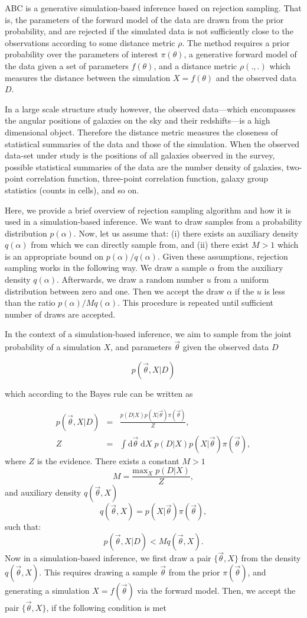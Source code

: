 \documentclass[12pt, preprint]{aastex}
\newcommand{\beq}{\begin{equation}}
\newcommand{\eeq}{\end{equation}}
\newcommand{\pars}{\vec{\theta}}
\newcommand{\dev}{\mathrm{d}}
\begin{document}
ABC is a generative simulation-based inference based on rejection sampling. That is, the parameters of the forward model of the data are drawn from the prior probability, and are rejected if the simulated data is not sufficiently close to the observations according to some distance metric $\rho$. The method requires a prior probability over the parameters of interest $\pi(\theta)$, a generative forward model of the data given a set of parameters $f(\theta)$, and a distance metric $\rho(.,.)$ which measures the distance between the simulation $X=f(\theta)$ and the observed data $D$. 

In a large scale structure study however, the observed data---which encompasses the angular positions of galaxies on the sky and their redshifts---is a high dimensional object. Therefore the distance metric measures the closeness of statistical summaries of the data and those of the simulation. When the observed data-set under study is the positions of all galaxies observed in the survey, possible statistical summaries of the data are the number density of galaxies, two-point correlation function, three-point correlation function, galaxy group statistics (counts in cells), and so on.

Here, we provide a brief overview of rejection sampling algorithm and how it is used in a simulation-based inference. We want to draw samples from a probability distribution $p(\alpha)$. Now, let us assume that: (i) there exists an auxiliary density $q(\alpha)$ from which we can directly sample from, and (ii) there exist $M>1$ which is an appropriate bound on $p(\alpha)/q(\alpha)$. Given these assumptions, rejection sampling works in the following way. We draw a sample $\alpha$ from the auxiliary density $q(\alpha)$. Afterwards, we draw a random number $u$ from a uniform distribution between zero and one. Then we accept the draw $\alpha$ if the $u$ is less than the ratio $p(\alpha)/Mq(\alpha)$. This procedure is repeated until sufficient number of draws are accepted.

In the context of a simulation-based inference, we aim to sample from the joint probability of a simulation $X$, and parameters $\pars$ given the observed data $D$

\beq
p(\pars,X | D)
\eeq

which according to the Bayes rule can be written as 

\begin{eqnarray}
p(\pars,X | D)  &=& \frac{p(D|X)p(X|\pars)\pi(\pars)}{Z},  \\
Z &=& \int \dev \pars \; \dev X \; p(D|X)p(X|\pars)\pi(\pars),
\end{eqnarray}
where $Z$ is the evidence. There exists a constant $M>1$ 
\beq 
M = \frac{\mathrm{max}_{X} \; p(D|X)}{Z},
\eeq 
and auxiliary density $q(\pars ,X)$
\beq 
q(\pars ,X)=p(X|\pars )\pi(\pars ),
\eeq 
such that:
\beq 
p(\pars ,X|D)<Mq(\pars ,X).
\eeq 
Now in a simulation-based inference, we first draw a pair $\{\pars , X \}$ from the density $q(\pars , X)$. This requires drawing a sample $\pars$ from the prior $\pi(\pars)$, and generating a simulation $X=f(\pars)$ via the forward model. Then, we accept the pair $\{\pars , X \}$, if the following condition is met
\end{document}
